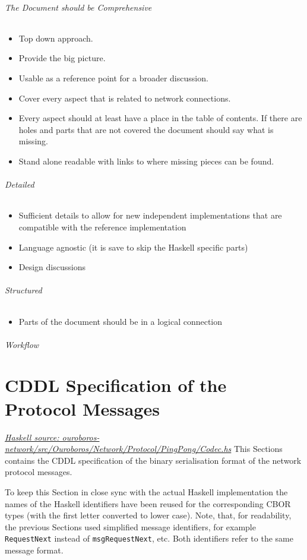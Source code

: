 \documentclass{report}
\newcommand{\hsref}[1]{\href{https://github.com/input-output-hk/ouroboros-network/blob/master/#1}{\emph{Haskell source: #1}}}
\theoremstyle{definition}{
  \newtheorem{lemma}{Lemma}[section] %
  \newtheorem{definition}[lemma]{Definition}
}
\theoremstyle{theorem}{
  \newtheorem{invariant}[lemma]{Invariant}
  \newtheorem{proofobligation}[lemma]{Proof Obligation}
}
\numberwithin{equation}{lemma}
\begin{document}
{\subparagraph{The Document should be Comprehensive}
\begin{itemize}
\item Top down approach.
\item Provide the big picture.
\item Usable as a reference point for a broader discussion.
\item Cover every aspect that is related to network connections.
\item Every aspect should at least have a place in the table of contents.
  If there are holes and parts that are not covered the document should say what is missing.
\item Stand alone readable with links to where missing pieces can be found.
\end{itemize}

\subparagraph{Detailed}
\begin{itemize}
\item Sufficient details to allow for new independent implementations that are compatible with
the reference implementation
\item Language agnostic (it is save to skip the Haskell specific parts)
\item Design discussions
\end{itemize}
\subparagraph{Structured}
\begin{itemize}
\item Parts of the document should be in a logical connection
\end{itemize}
\subparagraph{Workflow}
}

\appendix
\chapter{CDDL Specification of the Protocol Messages}
\label{CBOR-section}
\hsref{ouroboros-network/src/Ouroboros/Network/Protocol/PingPong/Codec.hs}
\label{included-cddl}
This Sections contains the CDDL\cite{cddl} specification
of the binary serialisation format of the network protocol messages.

To keep this Section in close sync with the actual Haskell implementation
the names of the Haskell identifiers have been reused for the corresponding
CBOR types (with the first letter converted to lower case).
Note, that, for readability, the previous Sections used simplified message identifiers,
for example {\tt RequestNext} instead of {\tt msgRequestNext}, etc.
Both identifiers refer to the same message format.
\end{document}
